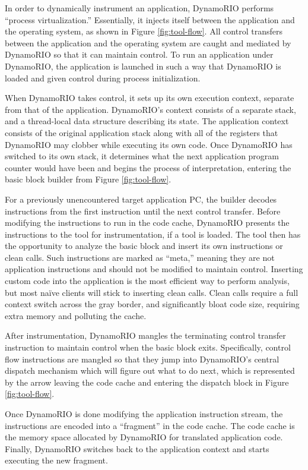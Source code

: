 In order to dynamically instrument an application, DynamoRIO performs ``process
virtualization.''  Essentially, it injects itself between the application and
the operating system, as shown in Figure \ref{fig:tool-flow}.  All control
transfers between the application and the operating system are caught and
mediated by DynamoRIO so that it can maintain control.  To run an application
under DynamoRIO, the application is launched in such a way that DynamoRIO is
loaded and given control during process initialization.

When DynamoRIO takes control, it sets up its own execution context, separate
from that of the application.  DynamoRIO's context consists of a separate stack,
and a thread-local data structure describing its state.  The application context
consists of the original application stack along with all of the registers that
DynamoRIO may clobber while executing its own code.  Once DynamoRIO has switched
to its own stack, it determines what the next application program counter would
have been and begins the process of interpretation, entering the basic block
builder from Figure \ref{fig:tool-flow}.

For a previously unencountered target application PC, the builder decodes
instructions from the first instruction until the next control transfer.  Before
modifying the instructions to run in the code cache, DynamoRIO presents the
instructions to the tool for instrumentation, if a tool is loaded.  The tool
then has the opportunity to analyze the basic block and insert its own
instructions or clean calls.  Such instructions are marked as ``meta,'' meaning
they are not application instructions and should not be modified to maintain
control.  Inserting custom code into the application is the most efficient way
to perform analysis, but most na\"ive clients will stick to inserting clean
calls.  Clean calls require a full context switch across the gray border, and
significantly bloat code size, requiring extra memory and polluting the cache.

After instrumentation, DynamoRIO mangles the terminating control transfer
instruction to maintain control when the basic block exits.  Specifically,
control flow instructions are mangled so that they jump into DynamoRIO's central
dispatch mechanism which will figure out what to do next, which is represented
by the arrow leaving the code cache and entering the dispatch block in Figure
\ref{fig:tool-flow}.

Once DynamoRIO is done modifying the application instruction stream, the
instructions are encoded into a ``fragment'' in the code cache.  The code cache
is the memory space allocated by DynamoRIO for translated application code.
Finally, DynamoRIO switches back to the application context and starts executing
the new fragment.

